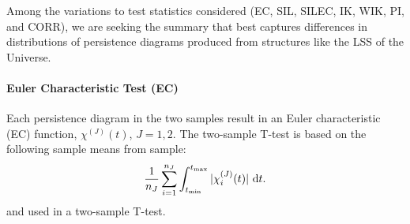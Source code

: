 \documentclass[12pt]{article}
\begin{document}
Among the variations to test statistics considered (EC, SIL, SILEC, IK, WIK, PI, and CORR), we are seeking the summary that best captures differences in distributions of persistence diagrams produced from structures like the LSS of the Universe.  

\paragraph{Euler Characteristic Test (EC)}
Each persistence diagram in the two samples result in an Euler characteristic (EC) function, $\chi^{(J)}(t)$,  $J = 1, 2$.
The two-sample T-test is based on the following sample means from sample:
\begin{equation*}
\frac{1}{n_J}\sum_{i = 1}^{n_J} \int_{t_{\min}}^{t_{\max}} | \chi_i^{(J)}(t) | \textup{ d}t.
\end{equation*}
and used in a two-sample T-test.
\end{document}

